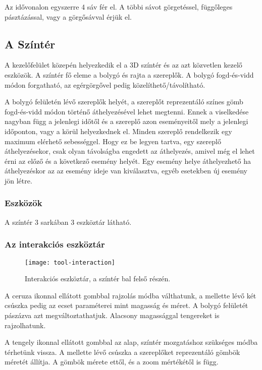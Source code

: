 Az idővonalon egyszerre 4 sáv fér el. A többi sávot görgetéssel, függőleges pásztázással, vagy a görgősávval érjük el.

\subsection{A Színtér} \label{section:ui-scene}

A kezelőfelület közepén helyezkedik el a 3D színtér és az azt közvetlen kezelő eszközök. A színtér fő eleme a bolygó és rajta a szereplők. A bolygó fogd-és-vidd módon forgatható, az egérgörgővel pedig közelíthető/távolítható.

A bolygó felületén lévő szereplők helyét, a szereplőt reprezentáló színes gömb fogd-és-vidd módon történő áthelyezésével lehet megtenni. Ennek a viselkedése nagyban függ a jelenlegi időtől és a szereplő azon eseményeitől mely a jelenlegi időponton, vagy a körül helyezkednek el. Minden szereplő rendelkezik egy maximum elérhető sebességgel. Hogy ez be legyen tartva, egy szereplő áthelyezésekor, csak olyan távolságba engedett az áthelyezés, amivel még el lehet érni az előző és a következő esemény helyét. Egy esemény helye áthelyezhető ha áthelyezéskor az az esemény ideje van kiválasztva, egyéb esetekben új esemény jön létre.


\subsubsection{Eszközök} \label{section:ui-utilities}

A színtér 3 sarkában 3 eszköztár látható.

\subsubsection{Az interakciós eszköztár}

\begin{figure}[h!]
	\centering
	\texttt{[image: tool-interaction]}
	\caption{Interakciós eszköztár, a színtér bal felső részén.}
	\label{fig:tool-interaction}
\end{figure}

A ceruza ikonnal ellátott gombbal rajzolás módba válthatunk, a mellette lévő két csúszka pedig az ecset paraméterei mint magasság és méret. A bolygó felületét pászázva azt megváltoztathatjuk. Alacsony magassággal tengereket is rajzolhatunk.

A tengely ikonnal ellátott gombbal az alap, színtér mozgatáshoz szükséges módba térhetünk vissza. A mellette lévő csúszka a szereplőket reprezentáló gömbök méretét állítja. A gömbök mérete ettől, és a zoom mértékétől is függ.


